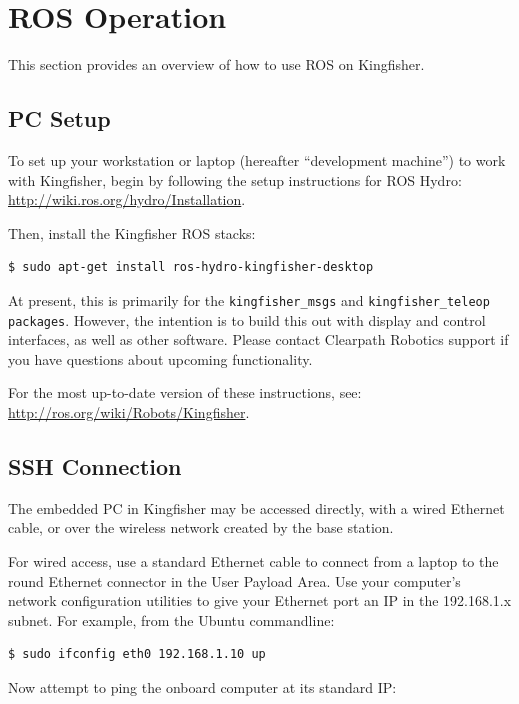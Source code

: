 \documentclass[]{clearpath-latex/clearpath-manual}
\begin{document}
\newpage

\section{ROS Operation}
This section provides an overview of how to use ROS on Kingfisher.

\subsection{PC Setup} \label{pcsetup}

To set up your workstation or laptop (hereafter “development machine”) to work with Kingfisher, begin by following the setup instructions for ROS Hydro: \url{http://wiki.ros.org/hydro/Installation}.

Then, install the Kingfisher ROS stacks:

\begin{lstlisting} 
$ sudo apt-get install ros-hydro-kingfisher-desktop
\end{lstlisting}

At present, this is primarily for the \lstinline{kingfisher_msgs} and \lstinline{kingfisher_teleop packages}. However, the intention is to build this out with display and control interfaces, as well as other software. Please contact Clearpath Robotics support if you have questions about upcoming functionality.

For the most up-to-date version of these instructions, see: \url{http://ros.org/wiki/Robots/Kingfisher}.

\subsection{SSH Connection}
The embedded PC in Kingfisher may be accessed directly, with a wired Ethernet cable, or over the wireless network created by the base station.

For wired access, use a standard Ethernet cable to connect from a laptop to the round Ethernet connector in the User Payload Area. Use your computer’s network configuration utilities to give your Ethernet port an IP in the 192.168.1.x subnet. For example, from the Ubuntu commandline:

\begin{lstlisting}
$ sudo ifconfig eth0 192.168.1.10 up
\end{lstlisting}

Now attempt to ping the onboard computer at its standard IP:
\end{document}
